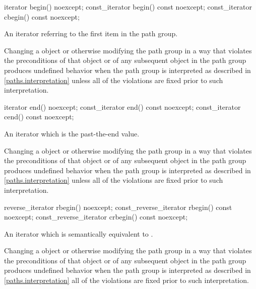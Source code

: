 %
%
\begin{itemdecl}
iterator begin() noexcept;
const_iterator begin() const noexcept;
const_iterator cbegin() const noexcept;
\end{itemdecl}
\begin{itemdescr}
\pnum
\returns
An iterator referring to the first  item in the path group.

\pnum
\remarks
Changing a  object or otherwise modifying the path group in a way that violates the preconditions of that  object or of any subsequent  object in the path group produces undefined behavior when the path group is interpreted as described in \ref{paths.interpretation} unless all of the violations are fixed prior to such interpretation.
\end{itemdescr}

%
%
\begin{itemdecl}
iterator end() noexcept;
const_iterator end() const noexcept;
const_iterator cend() const noexcept;
\end{itemdecl}
\begin{itemdescr}
\pnum
\returns
An iterator which is the past-the-end value.

\pnum
\remarks
Changing a  object or otherwise modifying the path group in a way that violates the preconditions of that  object or of any subsequent  object in the path group produces undefined behavior when the path group is interpreted as described in \ref{paths.interpretation} unless all of the violations are fixed prior to such interpretation.
\end{itemdescr}

%
%
\begin{itemdecl}
reverse_iterator rbegin() noexcept;
const_reverse_iterator rbegin() const noexcept;
const_reverse_iterator crbegin() const noexcept;
\end{itemdecl}
\begin{itemdescr}
\pnum
\returns
An iterator which is semantically equivalent to .

\pnum
\remarks
Changing a  object or otherwise modifying the path group in a way that violates the preconditions of that  object or of any subsequent  object in the path group produces undefined behavior when the path group is interpreted as described in \ref{paths.interpretation} all of the violations are fixed prior to such interpretation.
\end{itemdescr}

